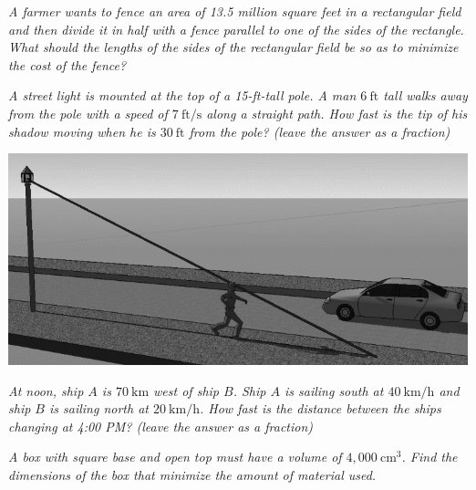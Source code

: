 \documentclass[12pt]{article}
\begin{document}
{\problem[50 pts] \em\large A farmer wants to fence an area of 13.5 million square feet in a rectangular field and then divide it in half with a fence parallel to one of the sides of the rectangle. What should the lengths of the sides of the rectangular field be so as to minimize the cost of the fence?}

{\problem[50 pts] \em\large A street light is mounted at the top of a 15-ft-tall pole.  A man $6~\text{ft}$ tall walks away from the pole with a speed of $7~\text{ft}/\text{s}$ along a straight path.  How fast is the tip of his shadow moving when he is $30~\text{ft}$ from the pole? (leave the answer as a fraction)}

\begin{center}
  \includegraphics[width=0.5\linewidth]{casey1.png}
\end{center}

{\problem[50 pts] \em\large At noon, ship $A$ is $70~\text{km}$ west of ship $B$.  Ship $A$ is sailing south at $40~\text{km}/\text{h}$ and ship $B$ is sailing north at $20~\text{km}/\text{h}$.  How fast is the distance between the ships changing at 4:00 PM? (leave the answer as a fraction)}
 
{\problem[50 pts] \em\large A box with square base and open top must have a volume of $4,000~\text{cm}^3$.  Find the dimensions of the box that minimize the amount of material used.}
\end{document}
